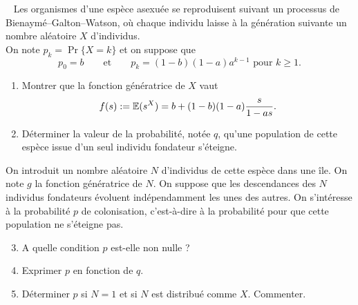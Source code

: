 
\begin{exercise}[Probabilités] ~ \label{exam:Proba}
  Les organismes d’une espèce asexuée se reproduisent suivant un processus de Bienaymé–Galton–Watson, où chaque individu laisse à la génération suivante un nombre aléatoire $X$ d’individus. \\
  On note $p_k = \Pr\{X = k\}$ et on suppose que 
  $$
  p_0 = b
  \qquad \text{et} \qquad 
  p_k = (1 - b) (1 - a) a^{k-1} \text{ pour } k \geq 1.
  $$
  \begin{enumerate}
    \item Montrer que la fonction génératrice de $X$ vaut
    $$
    f(s) := \operatorname{\mathbb{E}}(s^X) = b + (1-b)(1-a) \frac{s}{1 - as}.
    $$
    \item Déterminer la valeur de la probabilité, notée $q$, qu'une population de cette espèce issue d’un seul individu fondateur s'éteigne.
  \end{enumerate}
  On introduit un nombre aléatoire $N$ d'individus de cette espèce dans une île. On note $g$ la fonction génératrice de $N$. On suppose que les descendances des $N$ individus fondateurs évoluent indépendamment les unes des autres. On s'intéresse à la probabilité $p$ de colonisation, c'est-à-dire à la probabilité pour que cette population ne s'éteigne pas.
  \begin{enumerate}
    \setcounter{enumi}{2}
    \item A quelle condition $p$ est-elle non nulle ?
    \item Exprimer $p$ en fonction de $q$. 
    \item Déterminer $p$ si $N = 1$ et si $N$ est distribué comme $X$. Commenter.
  \end{enumerate}
\end{exercise}

